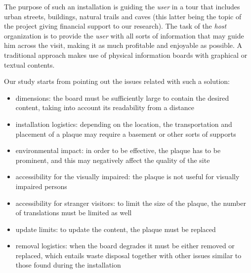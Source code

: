 \documentclass[sustainability,article,submit,pdftex,moreauthors]{Definitions/mdpi}
\begin{document}

The purpose of such an installation is guiding the {\em user} in a tour that includes urban streets, buildings, natural trails and caves (this latter being the topic of the project giving financial support to our research). The task of the {\em host} organization is to provide the {\em user} with all sorts of information that may guide him across the visit, making it as much profitable and enjoyable as possible. A traditional approach makes use of physical information boards with graphical or textual contents.


Our study starts from pointing out the issues related with such a solution:

\begin{itemize}
	\item dimensions: the board must be sufficiently large to contain the desired content, taking into account its readability from a distance
	\item installation logistics: depending on the location, the transportation and placement of a plaque may require a basement or other sorts of supports
	\item environmental impact: in order to be effective, the plaque has to be prominent, and this may negatively affect the quality of the site 
	\item accessibility for the visually impaired: the plaque is not useful for visually impaired persons
	\item accessibility for stranger visitors: to limit the size of the plaque, the number of translations must be limited as well
	\item update limits: to update the content, the plaque must be replaced
	\item removal logistics: when the board degrades it must be either removed or replaced, which entails waste disposal together with other issues similar to those found during the installation
\end{itemize}
\end{document}

